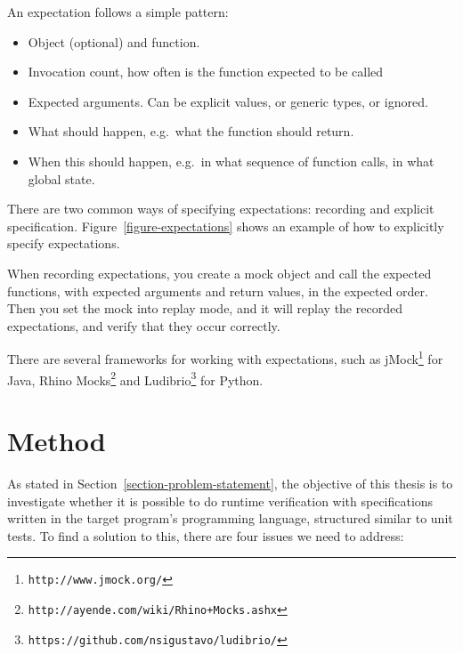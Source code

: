 \documentclass[a4paper,11pt]{kth-mag}
\begin{document}
An expectation follows a simple pattern:

\begin{itemize}
	\item Object (optional) and function.
	\item Invocation count, how often is the function expected to be called
	\item Expected arguments. Can be explicit values, or generic types, or
		ignored.
	\item What should happen, e.g.\ what the function should return.
	\item When this should happen, e.g.\ in what sequence of function calls, in
		what global state.
\end{itemize}

There are two common ways of specifying expectations: recording and explicit
specification. Figure~\ref{figure-expectations} shows an example of how to
explicitly specify expectations.

When recording expectations, you create a mock object and call the expected
functions, with expected arguments and return values, in the expected order.
Then you set the mock into replay mode, and it will replay the recorded
expectations, and verify that they occur correctly.

There are several frameworks for working with expectations, such as
jMock\footnote{\texttt{http://www.jmock.org/}} for Java, Rhino
Mocks\footnote{\texttt{http://ayende.com/wiki/Rhino+Mocks.ashx}} and
Ludibrio\footnote{\texttt{https://github.com/nsigustavo/ludibrio/}} for Python.






\pagestyle{newchap}
\chapter{Method} \label{chapter-method}

As stated in Section~\ref{section-problem-statement}, the objective of this
thesis is to investigate whether it is possible to do runtime verification with
specifications written in the target program's programming language, structured
similar to unit tests. To find a solution to this, there are four issues we
need to address:
\end{document}
